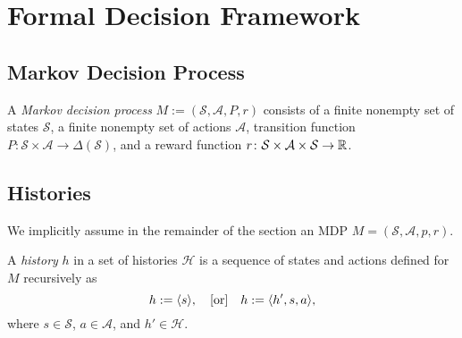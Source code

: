 
\section{Formal Decision Framework}

\subsection{Markov Decision Process}

\begin{definition} \label{def:MDP}
A \emph{Markov decision process} $M := (\mathcal{S}, \mathcal{A}, P, r)$ consists of a finite nonempty set of states $\mathcal{S}$, a finite nonempty set of actions $\mathcal{A}$, transition function $P\colon \mathcal{S} \times \mathcal{A} \to  \Delta(\mathcal{S})$, and a reward function $r \colon \mathcal{S} \times \mathcal{A} \times \mathcal{S} \to \mathbb{R}$.
 \leanok
\end{definition}

\subsection{Histories}

We implicitly assume in the remainder of the section an MDP $M = (\mathcal{S}, \mathcal{A}, p, r)$.
\begin{definition} \label{def:Hist}
A \emph{history} $h$ in a set of histories $\mathcal{H}$ is a sequence of states and actions defined for $M$ recursively as
\[
  h := \langle s \rangle, \quad
  \text{[or]} \quad
  h := \langle h', s, a \rangle,
\]
where $s \in \mathcal{S}$, $a\in \mathcal{A}$, and $h'\in \mathcal{H}$.
 \leanok
\end{definition}

